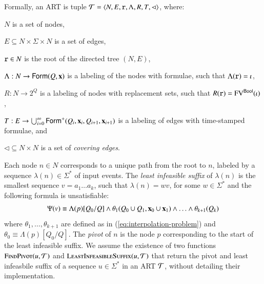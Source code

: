 \documentclass[10pt,conference,letterpaper,twocolumn]{IEEEtran}
\begin{document}
Formally, an ART is tuple $\mathcal{T} =
\left\langle N,E,\mathtt{r},\Lambda,R,T,\lhd \right\rangle$, where: \begin{compactitem}
\item $N$ is a set of nodes, 
%
\item $E \subseteq N \times \Sigma \times
N$ is a set of edges, 
%
\item $\mathtt{r} \in N$ is the root of the directed
tree $(N,E)$, 
%
\item $\Lambda : N \rightarrow \mathsf{Form}(Q,\mathbf x)$ is a labeling of the
  nodes with formulae, such that $\Lambda(\mathtt{r}) = \iota$,
%
\item $R : N \rightarrow 2^Q$ is a labeling of nodes with replacement
  sets, such that $R(\mathtt{r}) = \mathrm{FV}^{\mathsf{Bool}}(\iota)$,
%
\item $T : E \rightarrow \bigcup_{i=0}^\infty
  \mathsf{Form}^+(Q_i,\mathbf x_i,Q_{i+1},\mathbf x_{i+1})$ is a labeling of edges
  with time-stamped formulae, and
%
\item $\lhd \subseteq N \times N$ is a set of
\emph{covering edges}. 
\end{compactitem}

Each node $n \in N$ corresponds to a unique path from the root to $n$,
labeled by a sequence $\lambda(n) \in \Sigma^*$ of input events. The
\emph{least infeasible suffix} of $\lambda(n)$ is the smallest
sequence $v = a_1 \ldots a_k$, such that $\lambda(n) = wv$, for some
$w \in \Sigma^*$ and the following formula is unsatisfiable:
\begin{equation}\label{eq:pivot}
  \pivot{v} \equiv \Lambda(p)[Q_0/Q] \wedge
  \theta_1(Q_0 \cup Q_1,\vec{x}_0 \cup \vec{x}_1) \wedge \ldots \wedge
  \theta_{k+1}(Q_k)
\end{equation}
where $\theta_1,\ldots,\theta_{k+1}$ are defined as in
(\ref{eq:interpolation-problem}) and $\theta_0 \equiv
\Lambda(p)[Q_0/Q]$. The \emph{pivot} of $n$ is the node $p$
corresponding to the start of the least infeasible suffix.  We assume
the existence of two functions $\Call{FindPivot}{u,\Art}$ and
$\Call{LeastInfeasibleSuffix}{u,\Art}$ that return the pivot and least
infeasbile suffix of a sequence $u \in \Sigma^*$ in an ART $\mathcal{T}$,
without detailing their implementation. 
\end{document}
